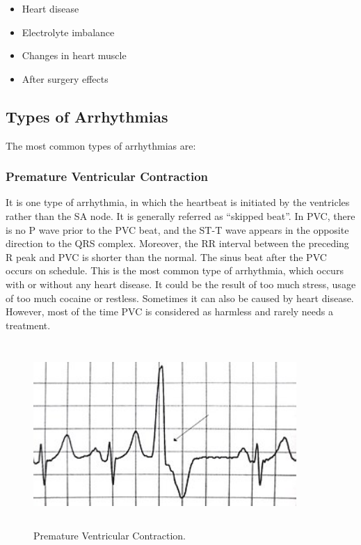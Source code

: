 \begin{itemize}
	\item Heart disease
	\item Electrolyte imbalance
	\item Changes in heart muscle
	\item After surgery effects
\end{itemize}

\subsection{Types of Arrhythmias}

The most common types of arrhythmias are:

\subsubsection{Premature Ventricular Contraction}
It is one type of arrhythmia, in which the heartbeat is initiated by the ventricles rather than the SA node. It is generally referred as ``skipped beat''. In PVC, there is no P wave prior to the PVC beat, and the ST-T wave appears in the opposite direction to the QRS complex. Moreover, the RR interval between the preceding R peak and PVC is shorter than the normal. The sinus beat after the PVC occurs on schedule. This is the most common type of arrhythmia, which occurs with or without any heart disease. It could be the result of too much stress, usage of too much cocaine or restless. Sometimes it can also be caused by heart disease. However, most of the time PVC is considered as harmless and rarely needs a treatment.

\begin{figure}[htpb]
	\centering
	\includegraphics[width=10cm,height=7cm,keepaspectratio=true]{images/pvc}
	\caption{
		Premature Ventricular Contraction\cite{wiki:pvc}.
	}
	\label{fig:pvc}
\end{figure}

